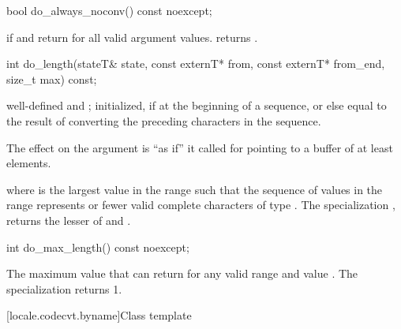 %
\begin{itemdecl}
bool do_always_noconv() const noexcept;
\end{itemdecl}

\begin{itemdescr}
\pnum
\returns
{}
if
and
return
for all valid argument values.
returns
.
\end{itemdescr}

%
\begin{itemdecl}
int do_length(stateT& state, const externT* from, const externT* from_end, size_t max) const;
\end{itemdecl}

\begin{itemdescr}
\pnum
\requires
{}
well-defined and
;
 initialized, if at the beginning of a sequence, or else equal to
the result of converting the preceding characters in the sequence.

\pnum
\effects
The effect on the  argument is ``as if'' it called
for  pointing to a buffer of at least  elements.

\pnum
\returns
{}
where
is the largest value in the range
such that the sequence of values in the range
represents
or fewer valid complete characters of type
.
The specialization
,
returns the lesser of
and
.
\end{itemdescr}

%
\begin{itemdecl}
int do_max_length() const noexcept;
\end{itemdecl}

\begin{itemdescr}
\pnum
\returns
The maximum value that
can return for any valid range
and
value
.
The specialization
returns 1.
\end{itemdescr}

[locale.codecvt.byname]{Class template }

